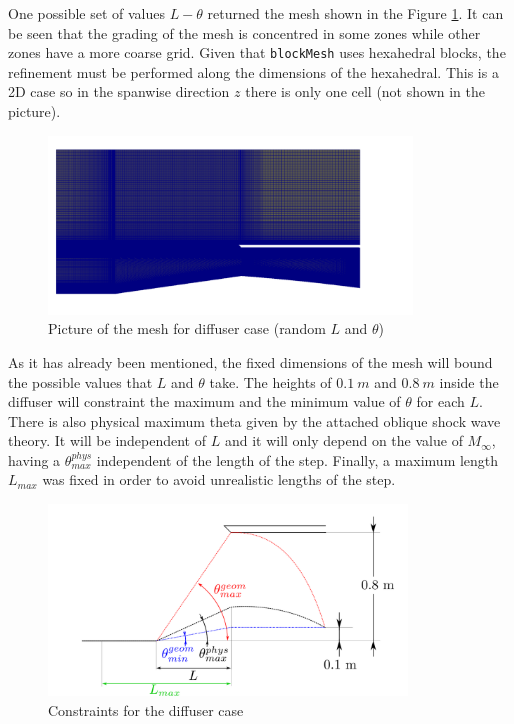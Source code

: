 One possible set of values $L-\theta$ returned the mesh shown in the Figure \ref{fig:diffuserMeshPF}. It can be seen that the grading of the mesh is concentred in some zones while other zones have a more coarse grid. Given that \texttt{blockMesh} uses hexahedral blocks, the refinement must be performed along the dimensions of the hexahedral. This is a 2D case so in the spanwise direction $z$ there is only one cell (not shown in the picture).

     \begin{figure}[h!]
        \centering
        \includegraphics[width=0.86\textwidth]{Figures/3/diffuserMeshPF.png}
        \caption{Picture of the mesh for diffuser case (random $L$ and $\theta$)}
        \label{fig:diffuserMeshPF}
    \end{figure}
    
   \newpage
   
   As it has already been mentioned, the fixed dimensions of the mesh will bound the possible values that $L$ and $\theta$ take. The heights of $0.1\ m$ and $0.8\ m$ inside the diffuser will constraint the maximum and the minimum value of $\theta$ for each $L$. There is also physical maximum theta given by the attached oblique shock wave theory. It will be independent of $L$ and it will only depend on the value of $M_\infty$, having a $\theta^{phys}_{max}$ independent of the length of the step. Finally, a maximum length $L_{max}$ was fixed in order to avoid unrealistic lengths of the step.
      
     \begin{figure}[h!]
        \centering
        \includegraphics[width=0.85\textwidth]{Figures/3/diffuserConst4.png}
        \caption{Constraints for the diffuser case}
        \label{fig:diffuserConstr}
    \end{figure}

